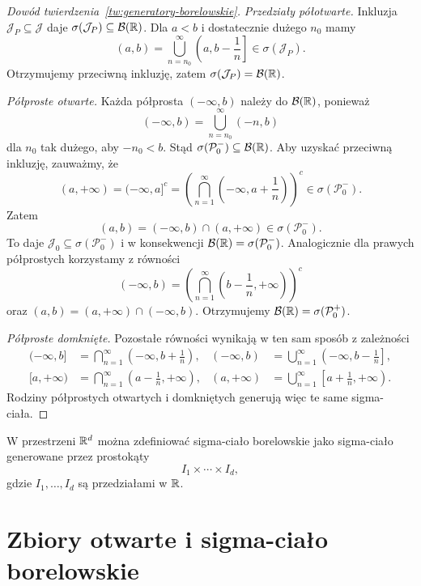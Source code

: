 \begin{proof}[Dowód twierdzenia~\ref{tw:generatory-borelowskie}]
\emph{Przedziały półotwarte.}
Inkluzja $\mathcal{J}_P\subseteq\mathcal{J}$ daje
$\sigma(\mathcal{J}_P)\subseteq\mathcal{B}(\mathbb{R})$.
Dla $a<b$ i dostatecznie dużego $n_0$ mamy
\[
  (a,b)=\bigcup_{n=n_0}^{\infty}
    \left(a,b-\frac1n\right]\in\sigma(\mathcal{J}_P).
\]
Otrzymujemy przeciwną inkluzję, zatem
$\sigma(\mathcal{J}_P)=\mathcal{B}(\mathbb{R})$.

\emph{Półproste otwarte.}
Każda półprosta $(-\infty,b)$ należy do $\mathcal{B}(\mathbb{R})$, ponieważ
\[
  (-\infty,b)=\bigcup_{n=n_0}^{\infty}(-n,b)
\]
dla $n_0$ tak dużego, aby $-n_0<b$.
Stąd $\sigma(\mathcal{P}_0^-)\subseteq\mathcal{B}(\mathbb{R})$.
Aby uzyskać przeciwną inkluzję, zauważmy, że
\[
  (a,+\infty)=(-\infty,a]^c
    =\left(\bigcap_{n=1}^{\infty}
      \left(-\infty,a+\frac1n\right)\right)^c
    \in\sigma(\mathcal{P}_0^-).
\]
Zatem
\[
  (a,b)=(-\infty,b)\cap(a,+\infty)
    \in\sigma(\mathcal{P}_0^-).
\]
To daje $\mathcal{J}_0\subseteq\sigma(\mathcal{P}_0^-)$ i w konsekwencji
$\mathcal{B}(\mathbb{R})=\sigma(\mathcal{P}_0^-)$.
Analogicznie dla prawych półprostych korzystamy z równości
\[
  (-\infty,b)=
    \left(\bigcap_{n=1}^{\infty}
      \left(b-\frac1n,+\infty\right)\right)^c
\]
oraz $(a,b)=(a,+\infty)\cap(-\infty,b)$.
Otrzymujemy $\mathcal{B}(\mathbb{R})=\sigma(\mathcal{P}_0^+)$.

\emph{Półproste domknięte.}
Pozostałe równości wynikają w ten sam sposób z zależności
\begin{align*}
  (-\infty,b]&=\bigcap_{n=1}^{\infty}
    \left(-\infty,b+\frac1n\right),
  &(-\infty,b)&=\bigcup_{n=1}^{\infty}
    \left(-\infty,b-\frac1n\right],\\
  [a,+\infty)&=\bigcap_{n=1}^{\infty}
    \left(a-\frac1n,+\infty\right),
  &(a,+\infty)&=\bigcup_{n=1}^{\infty}
    \left[a+\frac1n,+\infty\right).
\end{align*}
Rodziny półprostych otwartych i domkniętych generują więc te same sigma-ciała.
\end{proof}

\begin{uwaga}
W przestrzeni $\mathbb{R}^d$ można zdefiniować sigma-ciało borelowskie jako
sigma-ciało generowane przez prostokąty
\[
  I_1\times\cdots\times I_d,
\]
gdzie $I_1,\ldots,I_d$ są przedziałami w $\mathbb{R}$.
\end{uwaga}

\section{Zbiory otwarte i sigma-ciało borelowskie}
\label{sec:otwarte-borelowskie}

